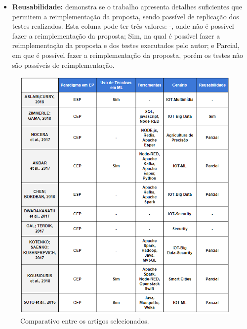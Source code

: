 \documentclass[ti,table]{texufpel} %
\begin{document}
\begin{itemize}
     

     \item \textbf{Reusabilidade:} demonstra se o trabalho apresenta detalhes suficientes que permitem a reimplementação da proposta, sendo passível de replicação dos testes realizados. Esta coluna pode ter três valores: -, onde não é possível fazer a reimplementação da proposta; Sim, na qual é possível fazer a reimplementação da proposta e dos testes executados pelo autor; e Parcial, em que é possível fazer a reimplementação da proposta, porém os testes não são passíveis de reimplementação. 

   

\end{itemize} 

  

\begin{figure} 

    \centering 

    \includegraphics[width=1\textwidth]{imagens/comparacaoArtigos.png} 

    \caption{Comparativo entre os artigos selecionados.} 

    \label{fig:comparacaoArtigos} 

\end{figure} 
\end{document}
